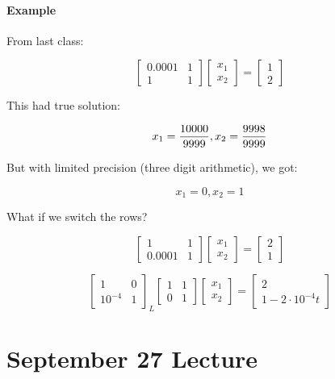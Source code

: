 \documentclass[12pt]{article}
\newcommand{\<}{\langle}
\renewcommand{\>}{\rangle}
\begin{document}
\paragraph{Example} From last class:

\[
	\begin{bmatrix}
		0.0001 & 1 \\ 1 & 1
	\end{bmatrix}
	\begin{bmatrix}
		x_1 \\ x_2
	\end{bmatrix} = 
	\begin{bmatrix}
		1 \\ 2
	\end{bmatrix}
\]

This had true solution:

\[
		x_1 = {10000 \over 9999}, x_2 = {9998 \over 9999}
\]

But with limited precision (three digit arithmetic), we got:

\[
		x_1 = 0, x_2 = 1
\]

What if we switch the rows?

\[
	\begin{bmatrix}
		1 & 1 \\ 0.0001 & 1
	\end{bmatrix}
	\begin{bmatrix}
		x_1 \\ x_2
	\end{bmatrix} = 
	\begin{bmatrix}
		2 \\ 1
	\end{bmatrix}
\]

\[
	\begin{bmatrix}
		1 & 0 \\ 10^{-4} & 1
	\end{bmatrix}_L
	\begin{bmatrix}
		1 & 1 \\ 0 & 1
	\end{bmatrix}
	\begin{bmatrix}
		x_1 \\ x_2
	\end{bmatrix} =
	\begin{bmatrix}
		2 \\ 1 - 2 \cdot 10^{-4}t
	\end{bmatrix}
\]

\section{September 27 Lecture}
\end{document}
